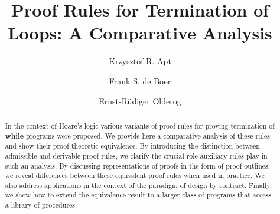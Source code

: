 \documentclass[manuscript, screen, review]{acmart}
\begin{document}

\title[Termination of Loops]%
 {Proof Rules for Termination of Loops: A Comparative Analysis}

\author{Krzysztof R. Apt}

\author{Frank S. de Boer}

\author{Ernst-R\"{u}diger Olderog}



\renewcommand{\shortauthors}{K.R. Apt, F.S. de Boer and E.-R. Olderog}


\begin{abstract}
  In the context of Hoare's logic various variants of proof rules for
  proving termination of \textbf{while} programs were proposed.
  We provide here a comparative analysis of these rules and show their
  proof-theoretic equivalence. By introducing the distinction between
  admissible and derivable proof rules, we clarify the crucial role
  auxiliary rules play in such an analysis. By discussing
  representations of proofs in the form of proof outlines, we reveal
  differences between these equivalent proof rules when used in
  practice. We also address applications in the context of the paradigm
  of design by contract.
  Finally, we show how to extend the equivalence result to a larger
  class of programs that access a library of procedures.
\end{abstract}
\end{document}
